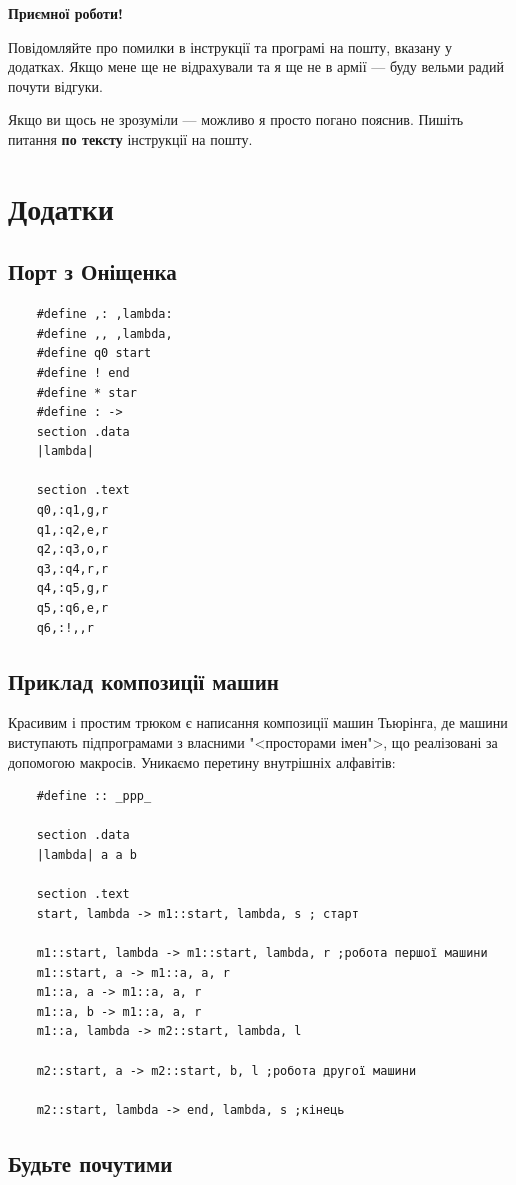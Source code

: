\documentclass[oneside,final,14pt]{extreport}
\begin{document}
\textbf{{\large Приємної роботи!}}

Повідомляйте про помилки в інструкції та програмі на пошту, вказану у додатках. Якщо мене ще не відрахували та я ще не в армії --- буду вельми радий почути відгуки.

Якщо ви щось не зрозуміли --- можливо я просто погано пояснив. Пишіть питання  {\bfseries по тексту} інструкції на пошту.

\chapter*{Додатки} 
\section*{Порт з Оніщенка}
\begin{verbatim}
	#define ,: ,lambda:
	#define ,, ,lambda,
	#define q0 start
	#define ! end
	#define * star
	#define : ->
	section .data
	|lambda|

	section .text
	q0,:q1,g,r
	q1,:q2,e,r
	q2,:q3,o,r
	q3,:q4,r,r
	q4,:q5,g,r
	q5,:q6,e,r
	q6,:!,,r
\end{verbatim}

\section*{Приклад композиції машин}
Красивим і простим трюком є написання композиції машин Тьюрінга, де машини виступають підпрограмами з власними "<просторами імен">, що реалізовані за допомогою макросів. Уникаємо перетину внутрішніх алфавітів:
\begin{verbatim}
	#define :: _ppp_

	section .data
	|lambda| a a b

	section .text
	start, lambda -> m1::start, lambda, s ; старт

	m1::start, lambda -> m1::start, lambda, r ;робота першої машини
	m1::start, a -> m1::a, a, r
	m1::a, a -> m1::a, a, r
	m1::a, b -> m1::a, a, r
	m1::a, lambda -> m2::start, lambda, l

	m2::start, a -> m2::start, b, l ;робота другої машини
			
	m2::start, lambda -> end, lambda, s ;кінець
\end{verbatim}
\section*{Будьте почутими}
\end{document}
